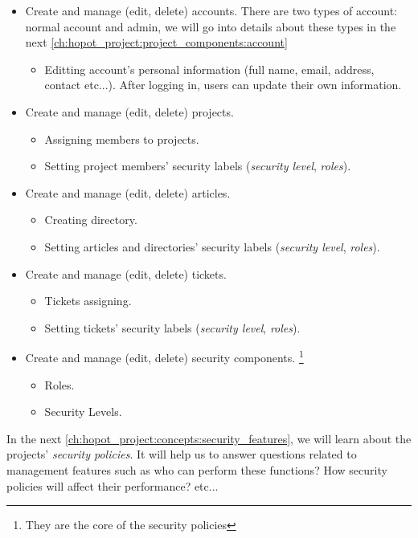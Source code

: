 \begin{itemize}
\item Create and manage (edit, delete) accounts. There are two types of account: normal account and admin, we will go into details about these types in the next \autoref{ch:hopot_project:project_components:account}
\begin{itemize} 
\item Editting account's personal information (\eg full name, email, address, contact etc...). 
After logging in, users can update their own information.
\end{itemize}

\item Create and manage (edit, delete) projects.
\begin{itemize} 
\item Assigning members to projects. 
\item Setting project members' security labels (\eg \emph{security level}, \emph{roles}).
\end{itemize}

\item Create and manage (edit, delete) articles.
\begin{itemize} 
\item Creating directory.
\item Setting articles and directories' security labels (\eg \emph{security level}, \emph{roles}).
\end{itemize}

\item Create and manage (edit, delete) tickets.
\begin{itemize} 
\item Tickets assigning.
\item Setting tickets' security labels (\eg \emph{security level}, \emph{roles}).
\end{itemize}

\item Create and manage (edit, delete) security components. \footnote{They are the core of the security policies}
\begin{itemize} 
\item Roles.
\item Security Levels.
\end{itemize}

\end{itemize}

In the next \autoref{ch:hopot_project:concepts:security_features}, we will learn about the projects' \emph{security policies}.
It will help us to answer questions related to management features such as who can perform these functions? How security policies will affect their performance? etc...

